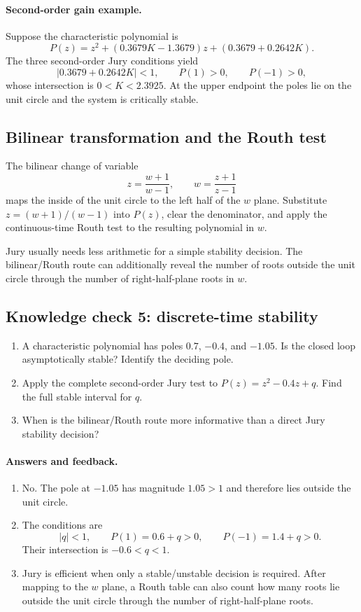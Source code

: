 \documentclass[11pt]{article}
\begin{document}
\paragraph{Second-order gain example.} Suppose the characteristic polynomial is
\[
P(z)=z^2+(0.3679K-1.3679)z+(0.3679+0.2642K).
\]
The three second-order Jury conditions yield
\[
|0.3679+0.2642K|<1,\qquad P(1)>0,\qquad P(-1)>0,
\]
whose intersection is $0<K<2.3925$. At the upper endpoint the poles lie on the unit circle and the system is critically stable.

\subsection{Bilinear transformation and the Routh test}

The bilinear change of variable
\[
z=\frac{w+1}{w-1},\qquad w=\frac{z+1}{z-1}
\]
maps the inside of the unit circle to the left half of the $w$ plane. Substitute $z=(w+1)/(w-1)$ into $P(z)$, clear the denominator, and apply the continuous-time Routh test to the resulting polynomial in $w$.

Jury usually needs less arithmetic for a simple stability decision. The bilinear/Routh route can additionally reveal the number of roots outside the unit circle through the number of right-half-plane roots in $w$.

\subsection*{Knowledge check 5: discrete-time stability}

\begin{enumerate}[label=\textbf{Q\arabic*.},wide]
  \item A characteristic polynomial has poles $0.7$, $-0.4$, and $-1.05$. Is the closed loop asymptotically stable? Identify the deciding pole.
  \item Apply the complete second-order Jury test to $P(z)=z^2-0.4z+q$. Find the full stable interval for $q$.
  \item When is the bilinear/Routh route more informative than a direct Jury stability decision?
\end{enumerate}

\paragraph{Answers and feedback.}
\begin{enumerate}[label=\textbf{A\arabic*.},wide]
  \item No. The pole at $-1.05$ has magnitude $1.05>1$ and therefore lies outside the unit circle.
  \item The conditions are
  \[
  |q|<1,\qquad P(1)=0.6+q>0,\qquad P(-1)=1.4+q>0.
  \]
  Their intersection is $-0.6<q<1$.
  \item Jury is efficient when only a stable/unstable decision is required. After mapping to the $w$ plane, a Routh table can also count how many roots lie outside the unit circle through the number of right-half-plane roots.
\end{enumerate}
\end{document}

